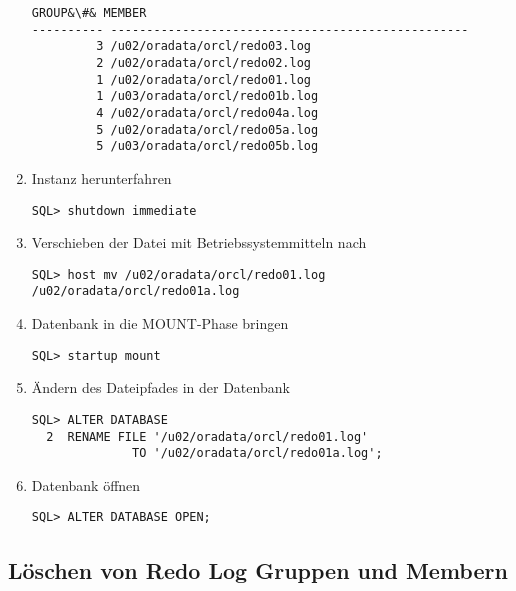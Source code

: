 \begin{enumerate}
\begin{lstlisting}[caption={Speicherorte der Member ermitteln},label=admin35,language=oracle_sql,alsolanguage=sqlplus]
    GROUP&\#& MEMBER
---------- --------------------------------------------------
         3 /u02/oradata/orcl/redo03.log
         2 /u02/oradata/orcl/redo02.log
         1 /u02/oradata/orcl/redo01.log
         1 /u03/oradata/orcl/redo01b.log
         4 /u02/oradata/orcl/redo04a.log
         5 /u02/oradata/orcl/redo05a.log
         5 /u03/oradata/orcl/redo05b.log
             \end{lstlisting}
          \item Instanz herunterfahren
            \begin{lstlisting}[caption={Instanz herunterfahren},label=admin36,language=sqlplus]
SQL> shutdown immediate
            \end{lstlisting}
          \item Verschieben der Datei  mit Betriebssystemmitteln nach \newline {}
            \begin{lstlisting}[caption={Verschieben der Redo Log Datei mit BS Mitteln},label=admin36a,language=sqlplus]
SQL> host mv /u02/oradata/orcl/redo01.log /u02/oradata/orcl/redo01a.log
            \end{lstlisting}
          \item Datenbank in die MOUNT-Phase bringen
            \begin{lstlisting}[caption={Datenbank MOUNTen},label=admin37,language=sqlplus]
SQL> startup mount
            \end{lstlisting}
          \item Ändern des Dateipfades in der Datenbank
                  \begin{lstlisting}[caption={Redo Log Datei umbenennen},label=admin38,language=oracle_sql]
SQL> ALTER DATABASE
  2  RENAME FILE '/u02/oradata/orcl/redo01.log'
              TO '/u02/oradata/orcl/redo01a.log';
            \end{lstlisting}
          \item Datenbank öffnen
            \begin{lstlisting}[caption={Datenbank öffnen},label=admin39,language=oracle_sql]
SQL> ALTER DATABASE OPEN;
            \end{lstlisting}
        \end{enumerate}
      \subsection{Löschen von Redo Log Gruppen und Membern}
